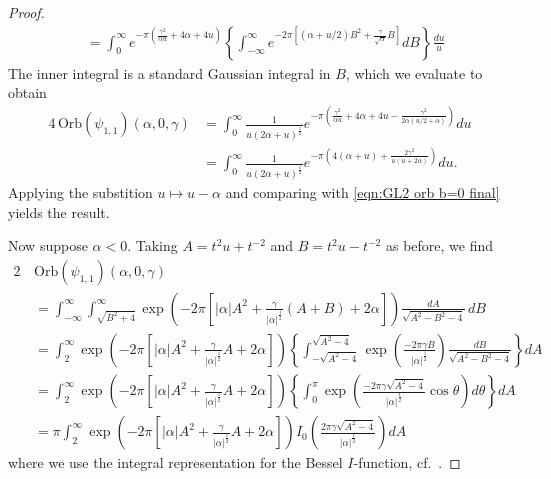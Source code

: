 \documentclass[reqno, 11pt]{amsart} %
\numberwithin{equation}{section}
\theoremstyle{plain}
\theoremstyle{definition}
\theoremstyle{remark}
\newcommand{\Orb}{\mathrm{Orb}}
\begin{document}
\begin{proof}
\begin{align*}
&=\int_0^{\infty} e^{-  \pi (\frac{ \gamma^2}{\alpha u} + 4\alpha +4 u )}  \left\{   \int_{-\infty}^{\infty}e^{- 2 \pi \left[    \left(  \alpha +  u/2 \right) B^2 + \frac{\gamma}{\sqrt \alpha} B   \right] } dB \right\} \frac{du}u
\end{align*}
The inner integral is a standard Gaussian integral in $B$, which we evaluate to obtain
\begin{align*}
4  \,  \Orb(\psi_{1,1})(\alpha, 0, \gamma) &=   \int_0^{\infty}\frac1{u(2\alpha + u)^{\frac12}} e^{ - \pi \left( \frac{ \gamma^2}{\alpha u} + 4\alpha +4 u - \frac{\gamma^2 }{2\alpha(u/2+{\alpha})}\right)   } du \\
&= \int_0^{\infty}\frac1{u(2\alpha + u)^{\frac12}} e^{ - \pi \left(  4(\alpha + u) + \frac{2\gamma^2 }{u(u+2{\alpha})}\right)   } du.
\end{align*}
Applying the substition $u \mapsto u - \alpha$ and comparing with \eqref{eqn:GL2 orb b=0 final} yields the result.

Now suppose $\alpha <0$. Taking $A = t^2 u + t^{-2}$ and $ B = t^2u - t^{-2}$ as before, we find
\begin{align*}
2 \, &\Orb(\psi_{1,1})(\alpha,0,\gamma)  \\ &= \int_{-\infty}^{\infty} \int_{\sqrt{B^2 + 4}}^{\infty} \exp\left( - 2 \pi \left[ |\alpha|  A^2 +  \frac{\gamma}{|\alpha|^{\frac12}} (A+B) + 2 \alpha \right] \right) \frac{dA}{\sqrt{A^2-B^2 - 4}} \, dB \\
&= \int_2^{\infty}   \exp\left( - 2 \pi \left[ |\alpha|A^2 + \frac{\gamma}{|\alpha|^{\frac12}} A + 2 \alpha \right] \right) \left\{  \int_{- \sqrt{A^2 - 4 } }^{\sqrt{A^2 -4}} \exp \left( \frac{- 2 \pi \gamma B }{|\alpha|^{\frac12}}   \right) \frac{dB}{\sqrt{A^2 - B^2 - 4}} \right\} dA \\
&= \int_2^{\infty} \exp\left( - 2 \pi \left[ |\alpha|A^2 + \frac{\gamma}{|\alpha|^{\frac12}} A + 2 \alpha \right] \right) \left\{  \int_0^{\pi}  \exp \left( \frac{- 2 \pi \gamma\sqrt{A^2 - 4}}{|\alpha|^{\frac12} } \cos\theta \right) d\theta   \right\} dA \\
&= \pi \int_2^{\infty} \exp\left( - 2 \pi \left[ |\alpha|A^2 + \frac{\gamma}{|\alpha|^{\frac12}} A + 2 \alpha \right] \right) I_0 \left( \frac{ 2 \pi \gamma\sqrt{A^2 - 4}}{|\alpha|^{\frac12} }   \right)   dA
\end{align*}
where we use the integral representation for the Bessel $I$-function, cf.\ \cite[10.32.1]{NIST:DLMF}.


\end{proof}
\end{document}
